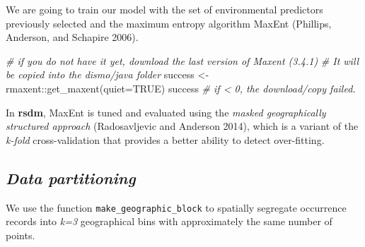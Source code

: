 \documentclass[
]{article}
\newenvironment{Shaded}{\begin{snugshade}}{\end{snugshade}}
\newcommand{\AttributeTok}[1]{\textcolor[rgb]{0.77,0.63,0.00}{#1}}
\newcommand{\CommentTok}[1]{\textcolor[rgb]{0.56,0.35,0.01}{\textit{#1}}}
\newcommand{\ConstantTok}[1]{\textcolor[rgb]{0.00,0.00,0.00}{#1}}
\newcommand{\FunctionTok}[1]{\textcolor[rgb]{0.00,0.00,0.00}{#1}}
\newcommand{\NormalTok}[1]{#1}
\newcommand{\OtherTok}[1]{\textcolor[rgb]{0.56,0.35,0.01}{#1}}
\newcommand{\SpecialCharTok}[1]{\textcolor[rgb]{0.00,0.00,0.00}{#1}}
\begin{document}
We are going to train our model with the set of environmental predictors
previously selected and the maximum entropy algorithm MaxEnt (Phillips,
Anderson, and Schapire 2006).

\begin{Shaded}
\begin{Highlighting}[]
\CommentTok{\# if you do not have it yet, download the last version of Maxent (3.4.1)}
\CommentTok{\# It will be copied into the dismo/java folder}
\NormalTok{success }\OtherTok{\textless{}{-}}\NormalTok{ rmaxent}\SpecialCharTok{::}\FunctionTok{get\_maxent}\NormalTok{(}\AttributeTok{quiet=}\ConstantTok{TRUE}\NormalTok{)}
\NormalTok{success }\CommentTok{\# if \textless{} 0, the download/copy failed.}
\end{Highlighting}
\end{Shaded}

In \textbf{rsdm}, MaxEnt is tuned and evaluated using the \emph{masked
geographically structured approach} (Radosavljevic and Anderson 2014),
which is a variant of the \emph{k-fold} cross-validation that provides a
better ability to detect over-fitting.

\hypertarget{data-partitioning}{%
\subsection{\texorpdfstring{\emph{Data
partitioning}}{Data partitioning}}\label{data-partitioning}}

We use the function \texttt{make\_geographic\_block} to spatially
segregate occurrence records into \emph{k=3} geographical bins with
approximately the same number of points.
\end{document}
